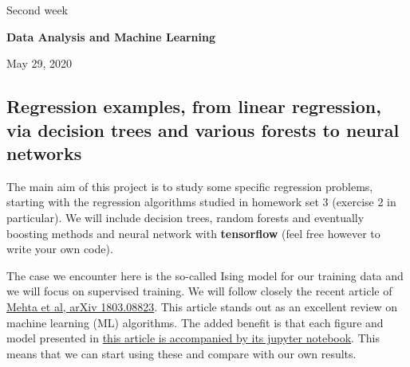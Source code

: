 \documentclass[%
oneside,                 %
final,                   %
10pt]{article}
\begin{document}

\newcommand{\exercisesection}[1]{\subsection*{#1}}






\thispagestyle{empty}

\begin{center}
{\LARGE\bf
\begin{spacing}{1.25}
Second week
\end{spacing}
}
\end{center}


\begin{center}
{\bf Data Analysis and Machine Learning${}^{}$} \\ [0mm]
\end{center}

\begin{center}
\end{center}
    

\begin{center}
May 29, 2020
\end{center}

\vspace{1cm}


\subsection{Regression examples, from linear regression, via decision trees and various forests to neural networks}

The main aim of this project is to study some specific 
regression problems, starting with the regression algorithms studied
in homework set 3 (exercise 2 in particular).
We will include decision trees, random forests and eventually boosting
methods  and neural network with \textbf{tensorflow} (feel free however to write your own code). 

The case we encounter here
is  the so-called Ising model for  our training data and we will
focus on supervised training. We will follow closely the recent
article of \href{{https://arxiv.org/abs/1803.08823}}{Mehta et al, arXiv
1803.08823}. This article stands
out as an excellent review on machine learning (ML) algorithms.
The added benefit is that each figure and
model presented in \href{{https://physics.bu.edu/~pankajm/MLnotebooks.html}}{this article is accompanied by its jupyter
notebook}. This
means that we can start using these and compare with our own results.
\end{document}
